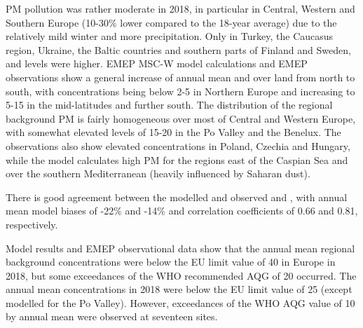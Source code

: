 PM pollution was rather moderate in 2018, in particular in Central, Western and Southern Europe (10-30\% lower compared to the 18-year average) due to the relatively mild winter and more precipitation. Only in Turkey, the Caucasus region, Ukraine, the Baltic countries and southern parts of Finland and Sweden, \PM[10] and \PM[2.5] levels were higher. 
EMEP MSC-W model calculations and EMEP observations show a general increase of annual mean \PM[10] and \PM[2.5] over land from north to south, with concentrations being below 2-5 \ug in Northern
Europe and increasing to 5-15 \ug in the mid-latitudes and further south.
The distribution of the regional background PM is fairly homogeneous over most of Central and Western Europe, with somewhat elevated \PM[10] levels of 15-20 \ug in the Po Valley and the Benelux. The observations also show elevated \PM[10] concentrations in Poland, Czechia and Hungary, while the model calculates high PM for the regions east of the Caspian Sea and over the southern Mediterranean (heavily influenced by Saharan dust). 

There is good agreement between the modelled and observed \PM[10] and \PM[2.5], with annual mean model biases of -22\% and -14\% and correlation coefficients of 0.66 and 0.81, respectively.

Model results and EMEP observational data show that the annual mean regional background \PM[10] concentrations were below the EU limit value of 40 \ug in Europe in 2018, but some exceedances of the WHO recommended AQG of 20 \ug occurred. 
The annual mean \PM[2.5] concentrations in 2018 were below the EU limit value of 25 \ug (except modelled \PM[2.5] for the Po Valley). However, exceedances of the WHO AQG value of 10 \ug by annual mean \PM[2.5] were observed at seventeen sites.%


